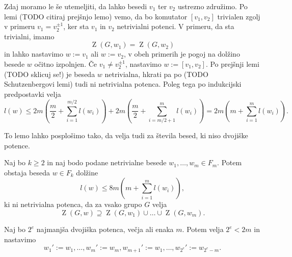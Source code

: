 \documentclass[mat1, tisk]{fmfdelo}
\begin{document}
\begin{dokaz}
        Zdaj moramo le še utemeljiti, da lahko besedi $v_1$ ter $v_2$ ustrezno združimo. Po lemi (TODO citiraj prejšnjo lemo) vemo, da bo komutator $[v_1, v_2]$ trivialen zgolj v primeru $v_1 = v_2^{\pm 1}$, ker sta $v_1$ in $v_2$ netrivialni potenci. V primeru, da sta trivialni, imamo \begin{equation*}
        \operatorname{Z}(G, w_1) = \operatorname{Z}(G, w_2)
        \end{equation*}  
         in lahko nastavimo $w := v_1$ ali $w := v_2$, v obeh primerih je pogoj na dolžino besede $w$ očitno izpolnjen. Če $v_1 \neq v_2^{\pm 1}$, nastavimo $w := [v_1, v_2]$. Po prejšnji lemi (TODO sklicuj se!) je beseda $w$ netrivialna, hkrati pa po (TODO Schutzenbergovi lemi) tudi ni netrivialna potenca. Poleg tega po indukcijski predpostavki velja
         \begin{equation*}
         l(w) \le 2m  \left(\frac{m}{2} + \sum_{i=1}^{m / 2} l(w_{i}) \right) + 2m \left(\frac{m}{2} + \sum_{i= m / 2 + 1}^{m} l(w_{i}) \right) = 2m \left( m + \sum_{i = 1}^{m} l(w_{i}) \right).
         \end{equation*}  
    \end{dokaz}

To lemo lahko posplošimo tako, da velja tudi za števila besed, ki niso dvojiške potence.

\begin{lema}
\label{lem_komutatorska_lema_posplositev}
Naj bo $k \ge 2$ in naj bodo podane netrivialne besede $w_1, \ldots, w_{m} \in  F_m$. Potem obstaja beseda $w \in F_k$ dolžine \begin{equation*}
l(w) \le 8m \left(m +  \sum_{i = 1}^{m} l(w_{i}) \right),
\end{equation*}  
ki ni netrivialna potenca, da za vsako grupo $G$ velja \begin{equation*}
\operatorname{Z}(G, w) \supseteq \operatorname{Z}(G, w_1) \cup \ldots \cup  \operatorname{Z}(G, w_{m}).
\end{equation*}    
\end{lema}
\begin{dokaz}
    Naj bo $2^{e}$ najmanjša dvojiška potenca, večja ali enaka $m$. Potem velja $2^{e} < 2m$ in nastavimo \begin{equation*}
    w_1' := w_1, \ldots, w_{m}' := w_{m}, w_{m+1}' := w_1, \ldots, w_{2^{e}}' := w_{2^{e} - m}. 
    \end{equation*}  
\end{dokaz}
\end{document}
